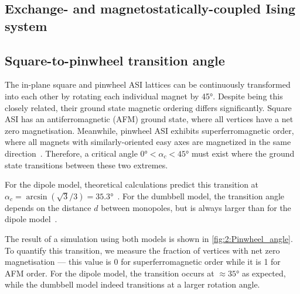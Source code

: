 \subsection{Exchange- and magnetostatically-coupled Ising system}
\subsection{Square-to-pinwheel transition angle}\label{sec:2:Verification_IP_SquarePinwheel}
The in-plane square and pinwheel ASI lattices can be continuously transformed into each other by rotating each individual magnet by \ang{45}.
Despite being this closely related, their ground state magnetic ordering differs significantly.
Square ASI has an antiferromagnetic (AFM) ground state, where all vertices have a net zero magnetisation.
Meanwhile, pinwheel ASI exhibits superferromagnetic order, where all magnets with similarly-oriented easy axes are magnetized in the same direction~\cite{ApparentFMpinwheel}.
Therefore, a critical angle $\ang{0} < \alpha_c < \ang{45}$ must exist where the ground state transitions between these two extremes. \par
For the dipole model, theoretical calculations predict this transition at $\alpha_c = \arcsin(\sqrt{3}/3) = \ang{35.3}$~\cite{AFM-FM-transition-Pinwheel,MagicAngle}.
For the dumbbell model, the transition angle depends on the distance $d$ between monopoles, but is always larger than for the dipole model~\cite{AFM-FM-transition-Pinwheel}. \\\par
The result of a \hotspice simulation using both models is shown in \cref{fig:2:Pinwheel_angle}.
To quantify this transition, we measure the fraction of vertices with net zero magnetisation --- this value is 0 for superferromagnetic order while it is 1 for AFM order.
For the dipole model, the transition occurs at $\approx \ang{35}$ as expected, while the dumbbell model indeed transitions at a larger rotation angle.

